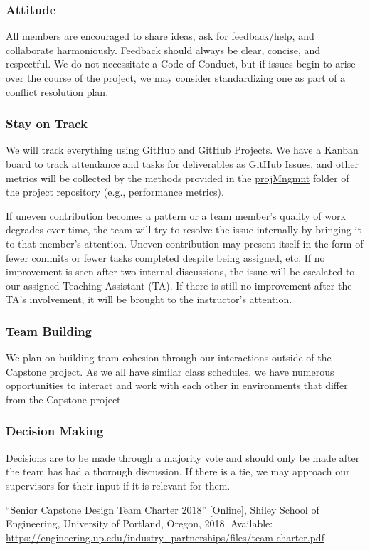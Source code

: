 \documentclass{article}
\begin{document}
\subsubsection*{Attitude}

All members are encouraged to share ideas, ask for feedback/help, and
collaborate harmoniously. Feedback should always be clear, concise, and
respectful. We do not necessitate a Code of Conduct, but if issues begin to
arise over the course of the project, we may consider standardizing one as part
of a conflict resolution plan.

\subsubsection*{Stay on Track}

We will track everything using GitHub and GitHub Projects. We have a Kanban
board to track attendance and tasks for deliverables as GitHub Issues, and other
metrics will be collected by the methods provided in the
\href{https://github.com/SumanyaG/Alkalytics/tree/main/docs/projMngmnt}{projMngmnt}
folder of the project repository (e.g., performance metrics).\newline

\noindent If uneven contribution becomes a pattern or a team member’s quality of
work degrades over time, the team will try to resolve the issue internally by
bringing it to that member’s attention. Uneven contribution may present itself
in the form of fewer commits or fewer tasks completed despite being assigned,
etc. If no improvement is seen after two internal discussions, the issue will be
escalated to our assigned Teaching Assistant (TA). If there is still no
improvement after the TA's involvement, it will be brought to the instructor's
attention.

\subsubsection*{Team Building}

We plan on building team cohesion through our interactions outside of the
Capstone project. As we all have similar class schedules, we have numerous
opportunities to interact and work with each other in environments that differ
from the Capstone project. 

\subsubsection*{Decision Making} 

Decisions are to be made through a majority vote and should only be made after
the team has had a thorough discussion. If there is a tie, we may approach our
supervisors for their input if it is relevant for them.

\newpage{}

\begin{thebibliography}{1}
   ``Senior Capstone Design Team Charter 2018'' [Online], Shiley
  School of Engineering, University of Portland, Oregon, 2018. Available:
  \url{https://engineering.up.edu/industry_partnerships/files/team-charter.pdf}
\end{thebibliography}
\end{document}

